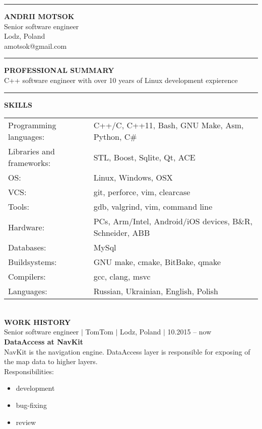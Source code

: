 \documentclass{article}
\begin{document}
\noindent\hrule height 5pt \vspace{4mm} \noindent
{\selectfont\huge{\textbf{ANDRII MOTSOK}}} \\
{\color{lightgray}Senior software engineer\\Lodz, Poland}\\
{\color{cyan}amotsok@gmail.com}\\
{\color{lightgray}\hrule height 0.2mm}
\vspace{2mm}
\noindent
\textbf{PROFESSIONAL SUMMARY}\\
C++ software engineer with over 10 years of Linux development expierence\\
{\color{lightgray}\hrule height 0.2mm} \vspace{2mm}
\noindent
\textbf{SKILLS}\\
\noindent\begin{tabular}{@{}ll}
  Programming languages: & C++/C, C++11, Bash, GNU Make, Asm, Python, C\# \\
  Libraries and frameworks: & STL, Boost, Sqlite, Qt, ACE\\
  OS: & Linux, Windows, OSX\\
  VCS: & git, perforce, vim, clearcase\\
  Tools: & gdb, valgrind, vim, command line\\
  Hardware: & PCs, Arm/Intel, Android/iOS devices, B\&R, Schneider, ABB\\
  Databases: &MySql\\
  Buildsystems: &GNU make, cmake, BitBake, qmake\\
  Compilers: &gcc, clang, msvc\\
  Languages: &Russian, Ukrainian, English, Polish
\end{tabular}\\
\vspace{2mm}
\noindent \textbf{WORK HISTORY}\\
\noindent Senior software engineer $\vert$ TomTom $\vert$ Lodz, Poland $\vert$ 10.2015 -- now\\
\textbf{DataAccess at NavKit}\\
NavKit is the navigation engine. DataAccess layer is responsible for exposing of the map data to higher layers.\\
Responsibilities:\\
\begin{itemize}
    \item development
    \item bug-fixing
    \item review
\end{itemize}
\end{document}
